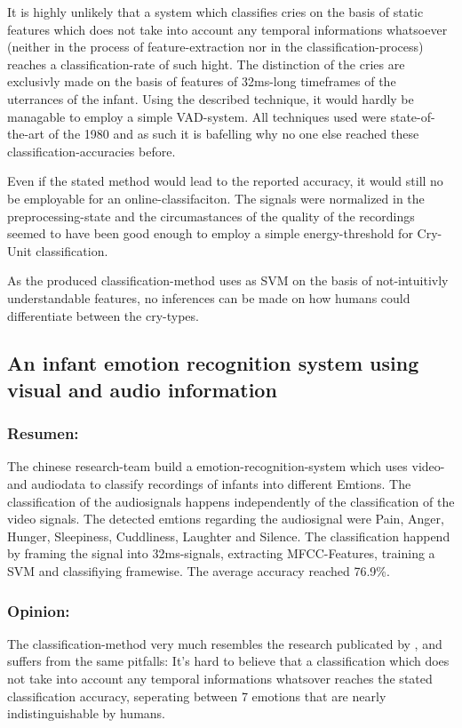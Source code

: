 \documentclass[11pt,twocolumn]{scrartcl}
\begin{document}
It is highly unlikely that a system which classifies cries on the basis of static features which does not take into account any temporal informations whatsoever (neither in the process of feature-extraction nor in the classification-process) reaches a classification-rate of such hight. The distinction of the cries are exclusivly made on the basis of features of 32ms-long timeframes of the uterrances of the infant. Using the described technique, it would hardly be managable to employ a simple VAD-system. All techniques used were state-of-the-art of the 1980 and as such it is bafelling why no one else reached these classification-accuracies before.

Even if the stated method would lead to the reported accuracy, it would still no be employable for an online-classifaciton. The signals were normalized in the preprocessing-state and the circumastances of the quality of the recordings seemed to have been good enough to employ a simple energy-threshold for Cry-Unit classification.

As the produced classification-method uses as SVM on the basis of not-intuitivly understandable features, no inferences can be made on how humans could differentiate between the cry-types.

\subsection{An infant emotion recognition system using visual and audio information} 

\subsubsection*{Resumen:} 
The chinese research-team build a emotion-recognition-system which uses video- and audiodata to classify recordings of infants into different Emtions. The classification of the audiosignals happens independently of the classification of the video signals. The detected emtions regarding the audiosignal were Pain, Anger, Hunger, Sleepiness, Cuddliness, Laughter and Silence. The classification happend by framing the signal into 32ms-signals, extracting MFCC-Features, training a SVM and classifiying framewise. The average accuracy reached 76.9\%.  \cite{chang2017dag}

\subsubsection*{Opinion:}
The classification-method very much resembles the research publicated by \cite{chang2017dag}, and suffers from the same pitfalls: It's hard to believe that a classification which does not take into account any temporal informations whatsover reaches the stated classification accuracy, seperating between 7 emotions that are nearly indistinguishable by humans.



\end{document}
